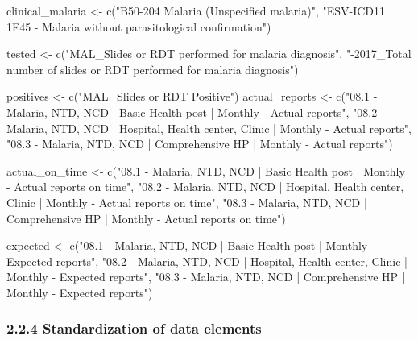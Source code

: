 \documentclass[
  letterpaper,
  DIV=11,
  numbers=noendperiod]{scrartcl}
\newenvironment{Shaded}{\begin{snugshade}}{\end{snugshade}}
\newcommand{\FunctionTok}[1]{\textcolor[rgb]{0.28,0.35,0.67}{#1}}
\newcommand{\NormalTok}[1]{\textcolor[rgb]{0.00,0.23,0.31}{#1}}
\newcommand{\OtherTok}[1]{\textcolor[rgb]{0.00,0.23,0.31}{#1}}
\newcommand{\StringTok}[1]{\textcolor[rgb]{0.13,0.47,0.30}{#1}}
\begin{document}
\begin{Shaded}
\begin{Highlighting}[]
\NormalTok{clinical\_malaria }\OtherTok{\textless{}{-}} \FunctionTok{c}\NormalTok{(}\StringTok{"B50{-}204 Malaria (Unspecified malaria)"}\NormalTok{,}
                      \StringTok{"ESV{-}ICD11 1F45 {-} Malaria without parasitological confirmation"}\NormalTok{)}

\NormalTok{tested }\OtherTok{\textless{}{-}} \FunctionTok{c}\NormalTok{(}\StringTok{"MAL\_Slides or RDT performed for malaria diagnosis"}\NormalTok{,}
            \StringTok{"{-}2017\_Total number of slides or RDT performed for malaria diagnosis"}\NormalTok{)}

\NormalTok{positives }\OtherTok{\textless{}{-}} \FunctionTok{c}\NormalTok{(}\StringTok{"MAL\_Slides or RDT Positive"}\NormalTok{)}
\NormalTok{actual\_reports }\OtherTok{\textless{}{-}} \FunctionTok{c}\NormalTok{(}\StringTok{"08.1 {-} Malaria, NTD, NCD | Basic Health post | Monthly {-} Actual reports"}\NormalTok{,}
                    \StringTok{"08.2 {-} Malaria, NTD, NCD | Hospital, Health center, Clinic | Monthly {-} Actual reports"}\NormalTok{,}
                    \StringTok{"08.3 {-} Malaria, NTD, NCD | Comprehensive HP | Monthly {-} Actual reports"}\NormalTok{)}

\NormalTok{actual\_on\_time }\OtherTok{\textless{}{-}} \FunctionTok{c}\NormalTok{(}\StringTok{"08.1 {-} Malaria, NTD, NCD | Basic Health post | Monthly {-} Actual reports on time"}\NormalTok{,}
                    \StringTok{"08.2 {-} Malaria, NTD, NCD | Hospital, Health center, Clinic | Monthly {-} Actual reports on time"}\NormalTok{,}
                    \StringTok{"08.3 {-} Malaria, NTD, NCD | Comprehensive HP | Monthly {-} Actual reports on time"}\NormalTok{)}

\NormalTok{expected }\OtherTok{\textless{}{-}} \FunctionTok{c}\NormalTok{(}\StringTok{"08.1 {-} Malaria, NTD, NCD | Basic Health post | Monthly {-} Expected reports"}\NormalTok{,}
              \StringTok{"08.2 {-} Malaria, NTD, NCD | Hospital, Health center, Clinic | Monthly {-} Expected reports"}\NormalTok{,}
              \StringTok{"08.3 {-} Malaria, NTD, NCD | Comprehensive HP | Monthly {-} Expected reports"}\NormalTok{)}
\end{Highlighting}
\end{Shaded}

\subsubsection{2.2.4 Standardization of data
elements}\label{standardization-of-data-elements}
\end{document}
